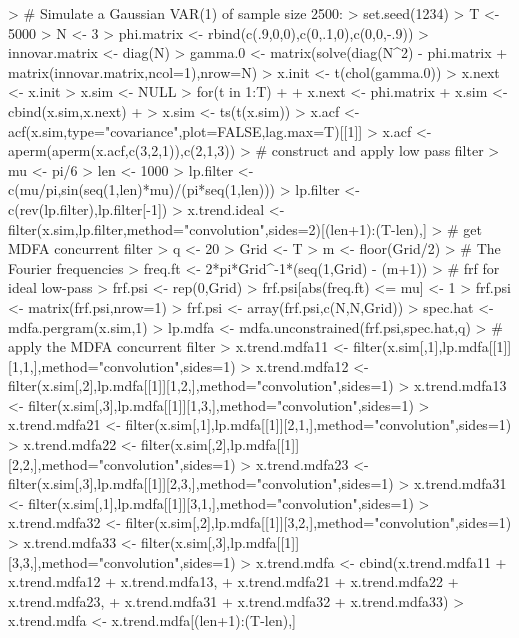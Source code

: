 \documentclass[a4paper]{book}
\begin{document}
\begin{Schunk}
\begin{Sinput}
> # Simulate a Gaussian VAR(1) of sample size 2500:
> set.seed(1234)
> T <- 5000
> N <- 3
> phi.matrix <- rbind(c(.9,0,0),c(0,.1,0),c(0,0,-.9))
> innovar.matrix <- diag(N)
> gamma.0 <- matrix(solve(diag(N^2) - phi.matrix %
+ 	matrix(innovar.matrix,ncol=1),nrow=N)
> x.init <- t(chol(gamma.0)) %
> x.next <- x.init
> x.sim <- NULL
> for(t in 1:T)
+ {
+ 	x.next <- phi.matrix %
+ 	x.sim <- cbind(x.sim,x.next)
+ }
> x.sim <- ts(t(x.sim))
> x.acf <- acf(x.sim,type="covariance",plot=FALSE,lag.max=T)[[1]]
> x.acf <- aperm(aperm(x.acf,c(3,2,1)),c(2,1,3))
> # construct and apply low pass filter
> mu <- pi/6
> len <- 1000
> lp.filter <- c(mu/pi,sin(seq(1,len)*mu)/(pi*seq(1,len)))
> lp.filter <- c(rev(lp.filter),lp.filter[-1])
> x.trend.ideal <- filter(x.sim,lp.filter,method="convolution",sides=2)[(len+1):(T-len),]
> # get MDFA concurrent filter
> q <- 20
> Grid <- T
> m <- floor(Grid/2)
> # The Fourier frequencies
> freq.ft <- 2*pi*Grid^{-1}*(seq(1,Grid) - (m+1))
> # frf for ideal low-pass
> frf.psi <- rep(0,Grid)
> frf.psi[abs(freq.ft) <= mu] <- 1
> frf.psi <- matrix(frf.psi,nrow=1) %
> frf.psi <- array(frf.psi,c(N,N,Grid))
> spec.hat <- mdfa.pergram(x.sim,1)	
> lp.mdfa <- mdfa.unconstrained(frf.psi,spec.hat,q)
> # apply the MDFA concurrent filter
> x.trend.mdfa11 <- filter(x.sim[,1],lp.mdfa[[1]][1,1,],method="convolution",sides=1)
> x.trend.mdfa12 <- filter(x.sim[,2],lp.mdfa[[1]][1,2,],method="convolution",sides=1)
> x.trend.mdfa13 <- filter(x.sim[,3],lp.mdfa[[1]][1,3,],method="convolution",sides=1)
> x.trend.mdfa21 <- filter(x.sim[,1],lp.mdfa[[1]][2,1,],method="convolution",sides=1)
> x.trend.mdfa22 <- filter(x.sim[,2],lp.mdfa[[1]][2,2,],method="convolution",sides=1)
> x.trend.mdfa23 <- filter(x.sim[,3],lp.mdfa[[1]][2,3,],method="convolution",sides=1)
> x.trend.mdfa31 <- filter(x.sim[,1],lp.mdfa[[1]][3,1,],method="convolution",sides=1)
> x.trend.mdfa32 <- filter(x.sim[,2],lp.mdfa[[1]][3,2,],method="convolution",sides=1)
> x.trend.mdfa33 <- filter(x.sim[,3],lp.mdfa[[1]][3,3,],method="convolution",sides=1)
> x.trend.mdfa <- cbind(x.trend.mdfa11 + x.trend.mdfa12 + x.trend.mdfa13,
+ 	x.trend.mdfa21 + x.trend.mdfa22 + x.trend.mdfa23,
+ 	x.trend.mdfa31 + x.trend.mdfa32 + x.trend.mdfa33)
> x.trend.mdfa <- x.trend.mdfa[(len+1):(T-len),] 
\end{Sinput}
\end{Schunk}
\end{document}
